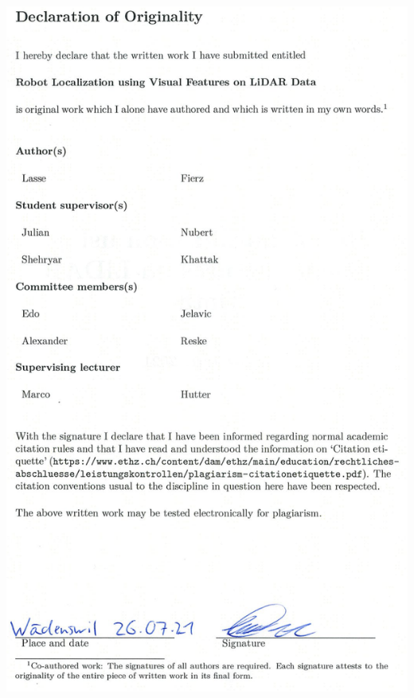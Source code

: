 \documentclass[10pt,twoside,a4paper]{report}
\begin{document}
% 
% 
\begin{center}
    \includegraphics[scale=0.65]{images/declaration/or_rep.png}

\end{center}
\end{document}
